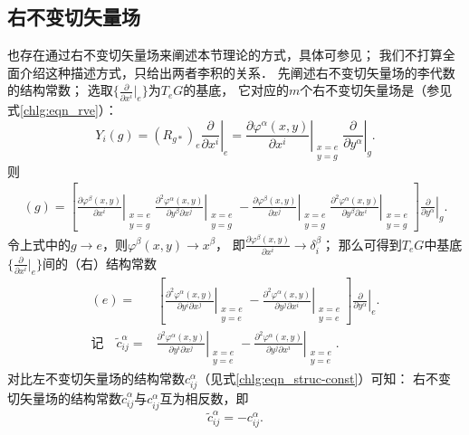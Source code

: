 \subsection{右不变切矢量场}
也存在通过右不变切矢量场来阐述本节理论的方式，具体可参见\parencite[\S 6.1]{cc2001-zh}；
我们不打算全面介绍这种描述方式，只给出两者李积的关系．
先阐述右不变切矢量场的李代数的结构常数；
选取$\{\frac{\partial}{\partial x^i}|_{e}\}$为$T_eG$的基底，
它对应的$m$个右不变切矢量场是（参见式\eqref{chlg:eqn_rve}）：
\begin{equation}
    Y_i(g)=(R_{g*})_e \left. \frac{\partial }{\partial x^i }\right|_{e}
    = \left. \frac{\partial \varphi^\alpha (x,y)}{\partial x^i} 
    \right|_{\substack{x=e\\y=g}}   \left. \frac{\partial}{\partial y^\alpha}\right|_{g} .
\end{equation}
则 \setlength{\mathindent}{0em}
\begin{align*}
    [Y_i, Y_j](g)= \left[ \left. \frac{\partial \varphi^\beta (x,y)}{\partial x^i} \right|_{\substack{x=e\\y=g}}
    \left. \frac{\partial^2 \varphi^\alpha (x,y)}{\partial y^\beta \partial x^j} \right|_{\substack{x=e\\y=g}} 
    - \left. \frac{\partial \varphi^\beta (x,y)}{\partial x^j} \right|_{\substack{x=e\\y=g}}
    \left. \frac{\partial^2 \varphi^\alpha (x,y)}{\partial y^\beta \partial x^i} \right|_{\substack{x=e\\y=g}} 
    \right] \left. \frac{\partial}{\partial y^\alpha}\right|_{g} .
\end{align*}\setlength{\mathindent}{2em}
令上式中的$g\to e$，则$\varphi^\beta(x,y) \to x^\beta$，
即$\frac{\partial \varphi^\beta (x,y)}{\partial x^i}\to \delta^\beta_i$；
那么可得到$T_eG$中基底$\{\frac{\partial}{\partial x^i}|_{e}\}$间的（右）结构常数
\begin{align}
    [Y_i, Y_j](e)=& \left[ \left. \frac{\partial^2 \varphi^\alpha (x,y)}{\partial y^i \partial x^j} \right|_{\substack{x=e\\y=e}} 
    -\left. \frac{\partial^2 \varphi^\alpha (x,y)}{\partial y^j \partial x^i} \right|_{\substack{x=e\\y=e}} 
    \right] \left. \frac{\partial}{\partial y^\alpha}\right|_{e} . \\
    \text{记}\quad 
    \tilde{c}^\alpha_{ij}=&\left. \frac{\partial^2 \varphi^\alpha (x,y)}{\partial y^i \partial x^j} \right|_{\substack{x=e\\y=e}} -\left. 
    \frac{\partial^2 \varphi^\alpha (x,y)}{\partial y^j \partial x^i} \right|_{\substack{x=e\\y=e}} . \label{chlg:eqn_struc-const-R}
\end{align}
对比左不变切矢量场的结构常数$c^\alpha_{ij}$（见式\eqref{chlg:eqn_struc-const}）可知：
右不变切矢量场的结构常数$\tilde{c}^\alpha_{ij}$与$c^\alpha_{ij}$互为相反数，即
\begin{equation}\label{chlg:eqn_SC-lr}
    \tilde{c}^\alpha_{ij} = -c^\alpha_{ij} .
\end{equation}



